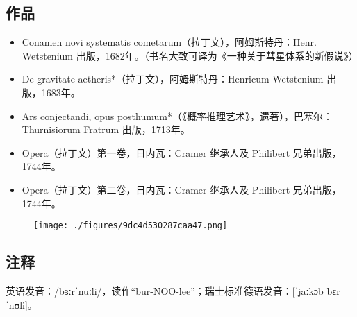 \subsection{作品}
\begin{itemize}
\item Conamen novi systematis cometarum（拉丁文），阿姆斯特丹：Henr. Wetstenium 出版，1682年。（书名大致可译为《一种关于彗星体系的新假说》）
\item De gravitate aetheris*（拉丁文），阿姆斯特丹：Henricum Wetstenium 出版，1683年。
\item Ars conjectandi, opus posthumum*（《概率推理艺术》，遗著），巴塞尔：Thurnisiorum Fratrum 出版，1713年。
\item Opera（拉丁文）第一卷，日内瓦：Cramer 继承人及 Philibert 兄弟出版，1744年。
\item Opera（拉丁文）第二卷，日内瓦：Cramer 继承人及 Philibert 兄弟出版，1744年。
\end{itemize}
\begin{figure}[ht]
\centering
\texttt{[image: ./figures/9dc4d530287caa47.png]}
\caption{} \label{fig_YGBbnl_6}
\end{figure}
\subsection{注释}
英语发音：/bɜːrˈnuːli/，读作“bur-NOO-lee”；瑞士标准德语发音：[ˈjaːkɔb bɛrˈnʊli]。
